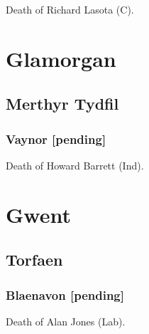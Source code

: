 \documentclass[a4paper,openany]{book}
\begin{document}
\begin{resultsiii}

Death of Richard Lasota (C).

\section{Glamorgan}

\subsection*{Merthyr Tydfil}

\subsubsection*{Vaynor \hspace*{\fill}\nolinebreak[1]%
	\enspace\hspace*{\fill}
	[pending]}


Death of Howard Barrett (Ind).

\section{Gwent}

\subsection*{Torfaen}

\subsubsection*{Blaenavon \hspace*{\fill}\nolinebreak[1]%
	\enspace\hspace*{\fill}
	[pending]}


Death of Alan Jones (Lab).


\end{resultsiii}
\end{document}

